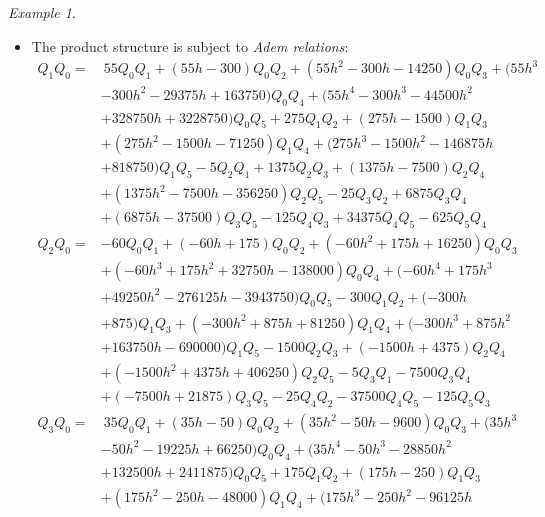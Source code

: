 \documentclass{gtpart}
\theoremstyle{definition}
\theoremstyle{remark}
\newtheorem{ex}[thm]{Example}
\renewcommand{\=}{\approx}
\renewcommand{\-}{\sim}
\numberwithin{equation}{section}
\numberwithin{thm}{section}
\begin{document}
\begin{ex}
\begin{itemize}
  \item {}\label{Adem} The product structure is subject to {\em Adem relations}: 
  \begin{equation*}
   \begin{split}
    Q_1 Q_0 = & ~ 55 Q_0 Q_1+(55 h-300) Q_0 Q_2+(55 h^2-300 h-14250) Q_0 Q_3 +(55 h^3 \\
              & -300 h^2-29375 h +163750) Q_0 Q_4+(55 h^4-300 h^3 -44500 h^2 \\
              & +328750 h+3228750) Q_0 Q_5 +275 Q_1 Q_2 +(275 h -1500) Q_1 Q_3 \\
              & +(275 h^2-1500 h-71250) Q_1 Q_4+(275 h^3 -1500 h^2 -146875 h \\
              & +818750) Q_1 Q_5-5 Q_2 Q_1+1375 Q_2 Q_3 +(1375 h-7500) Q_2 Q_4 
   \end{split}
  \end{equation*}
  \begin{equation*}
   \begin{split}
              & +(1375 h^2 -7500 h -356250) Q_2 Q_5 -25 Q_3 Q_2+6875 Q_3 Q_4 \\
              & +(6875 h-37500) Q_3 Q_5-125 Q_4 Q_3 +34375 Q_4 Q_5-625 Q_5 Q_4 \\
    Q_2 Q_0 = & -60 Q_0 Q_1+(-60 h+175) Q_0 Q_2+(-60 h^2+175 h+16250) Q_0 Q_3 \\
              & +(-60 h^3+175 h^2 +32750 h-138000) Q_0 Q_4+(-60 h^4+175 h^3 \\
              & +49250 h^2-276125 h-3943750) Q_0 Q_5 -300 Q_1 Q_2+(-300 h \\
              & +875) Q_1 Q_3+(-300 h^2+875 h+81250) Q_1 Q_4+(-300 h^3 +875 h^2 \\
              & +163750 h-690000) Q_1 Q_5-1500 Q_2 Q_3+(-1500 h +4375) Q_2 Q_4 \\
              & +(-1500 h^2 +4375 h +406250) Q_2 Q_5-5 Q_3 Q_1 -7500 Q_3 Q_4 \\
              & +(-7500 h+21875) Q_3 Q_5-25 Q_4 Q_2 -37500 Q_4 Q_5 -125 Q_5 Q_3 \\
    Q_3 Q_0 = & ~ 35 Q_0 Q_1+(35 h-50) Q_0 Q_2+(35 h^2-50 h-9600) Q_0 Q_3+(35 h^3 \\
              & -50 h^2-19225 h +66250) Q_0 Q_4+(35 h^4-50 h^3-28850 h^2 \\
              & +132500 h+2411875) Q_0 Q_5+175 Q_1 Q_2 +(175 h-250) Q_1 Q_3 \\
              & +(175 h^2-250 h-48000) Q_1 Q_4+(175 h^3-250 h^2-96125 h \\

\end{split}
\end{equation*}
\end{itemize}
\end{ex}
\end{document}

